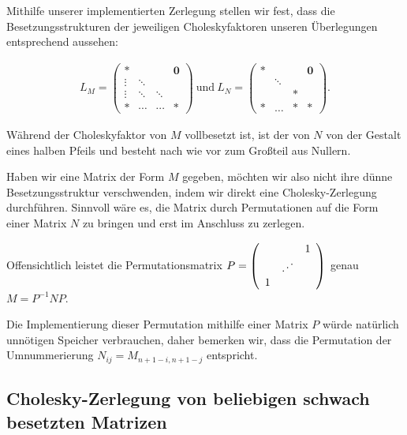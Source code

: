 Mithilfe unserer implementierten Zerlegung stellen wir fest, dass die Besetzungsstrukturen der jeweiligen Choleskyfaktoren unseren Überlegungen entsprechend aussehen:

\begin{align*}
    L_{M} =
\left(\begin{array}{cccccc}
                \ast &&&\boldsymbol{0} \\
                \vdots & \ddots && \\
                \vdots & \ddots & \ddots & \\
                \ast &\cdots &\cdots & \ast
      \end{array}
\right)
\mathrm{~und~}
    L_{N} =
\left(\begin{array}{cccccc}
                \ast &&& \boldsymbol{0} \\
                & \ddots && \\
                && \ast & \\
                \ast & \hdots & \ast & \ast
      \end{array}
\right).
\end{align*}

Während der Choleskyfaktor von $M$ vollbesetzt ist, ist der von $N$ von der Gestalt eines halben Pfeils und besteht nach wie vor zum Großteil aus Nullern.

Haben wir eine Matrix der Form $M$ gegeben, möchten wir also nicht ihre dünne Besetzungsstruktur verschwenden, indem wir direkt eine Cholesky-Zerlegung durchführen. Sinnvoll wäre es, die Matrix durch Permutationen auf die Form einer Matrix $N$ zu bringen und erst im Anschluss zu zerlegen.

Offensichtlich leistet die Permutationsmatrix $P =
\left(\begin{array}{cccccc}
                &&1 \\
                & \reflectbox{$\ddots$}& \\
                1  &  &
      \end{array}
\right) $ genau
$M=P^{-1}NP$.

Die Implementierung dieser Permutation mithilfe einer Matrix $P$ würde natürlich unnötigen Speicher verbrauchen, daher bemerken wir, dass die Permutation der Umnummerierung $N_{ij} = M_{n+1-i,n+1-j}$ entspricht.

\subsection{Cholesky-Zerlegung von beliebigen schwach besetzten Matrizen}

